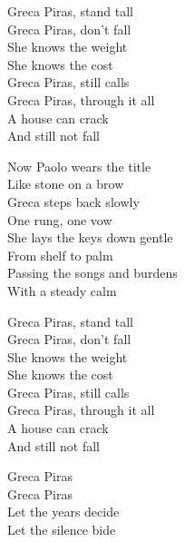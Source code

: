 \begin{lyrics}
Greca Piras, stand tall\\
Greca Piras, don’t fall\\
She knows the weight\\
She knows the cost\\
Greca Piras, still calls\\
Greca Piras, through it all\\
A house can crack\\
And still not fall

Now Paolo wears the title\\
Like stone on a brow\\
Greca steps back slowly\\
One rung, one vow\\
She lays the keys down gentle\\
From shelf to palm\\
Passing the songs and burdens\\
With a steady calm

Greca Piras, stand tall\\
Greca Piras, don’t fall\\
She knows the weight\\
She knows the cost\\
Greca Piras, still calls\\
Greca Piras, through it all\\
A house can crack\\
And still not fall

Greca Piras\\
Greca Piras\\
Let the years decide\\
Let the silence bide
\end{lyrics}


